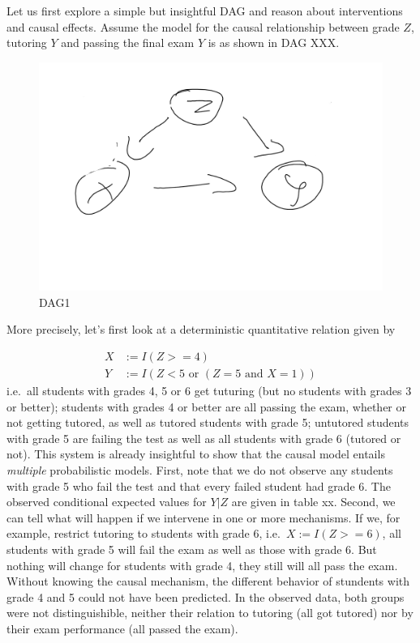 \documentclass[
]{book}
\theoremstyle{definition}
\theoremstyle{definition}
\theoremstyle{definition}
\theoremstyle{remark}
\begin{document}
Let us first explore a simple but insightful DAG and reason about interventions and causal effects. Assume the model for the causal relationship between grade \(Z\), tutoring \(Y\) and passing the final exam \(Y\) is as shown in DAG XXX.

\begin{figure}
\centering
\includegraphics{images/dag_exmpl_tut1.png}
\caption{DAG1}
\end{figure}

More precisely, let's first look at a deterministic quantitative relation given by

\begin{align}
X &:= I(Z >= 4) \\
Y &:= I(Z < 5 \text{ or } (Z = 5 \text{ and } X = 1))
\end{align}
i.e.~all students with grades 4, 5 or 6 get tuturing (but no students with grades 3 or better); students with grades 4 or better are all passing the exam, whether or not getting tutored, as well as tutored students with grade 5; untutored students with grade 5 are failing the test as well as all students with grade 6 (tutored or not).
This system is already insightful to show that the causal model entails \emph{multiple} probabilistic models. First, note that we do not observe any students with grade 5 who fail the test and that every failed student had grade 6. The observed conditional expected values for \(Y|Z\) are given in table xx.
Second, we can tell what will happen if we intervene in one or more mechanisms. If we, for example, restrict tutoring to students with grade 6, i.e.~\(X := I(Z >= 6)\), all students with grade 5 will fail the exam as well as those with grade 6. But nothing will change for students with grade 4, they still will all pass the exam. Without knowing the causal mechanism, the different behavior of stundents with grade 4 and 5 could not have been predicted. In the observed data, both groups were not distinguishible, neither their relation to tutoring (all got tutored) nor by their exam performance (all passed the exam).
\end{document}
